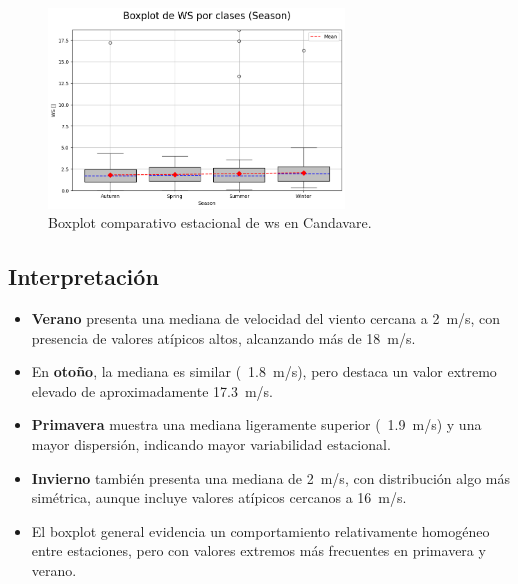 \vspace{0.2cm}

\begin{figure}[htbp]
\centering
\includegraphics[width=0.7\textwidth]{resultados/por_estacion_del_anio/boxplot_clases_por_estacion/Candavare/WS_ClassBoxplot_Season.png}
\caption{Boxplot comparativo estacional de \gls{ws}  en Candavare.}
\label{fig:candavare_ws_box}
\end{figure}

\subsection*{Interpretación}

\begin{itemize}
    \item \textbf{Verano} presenta una mediana de velocidad del viento cercana a 2~m/s, con presencia de valores atípicos altos, alcanzando más de 18~m/s.
    \item En \textbf{otoño}, la mediana es similar (~1.8~m/s), pero destaca un valor extremo elevado de aproximadamente 17.3~m/s.
    \item \textbf{Primavera} muestra una mediana ligeramente superior (~1.9~m/s) y una mayor dispersión, indicando mayor variabilidad estacional.
    \item \textbf{Invierno} también presenta una mediana de 2~m/s, con distribución algo más simétrica, aunque incluye valores atípicos cercanos a 16~m/s.
    \item El boxplot general evidencia un comportamiento relativamente homogéneo entre estaciones, pero con valores extremos más frecuentes en primavera y verano.
\end{itemize}
